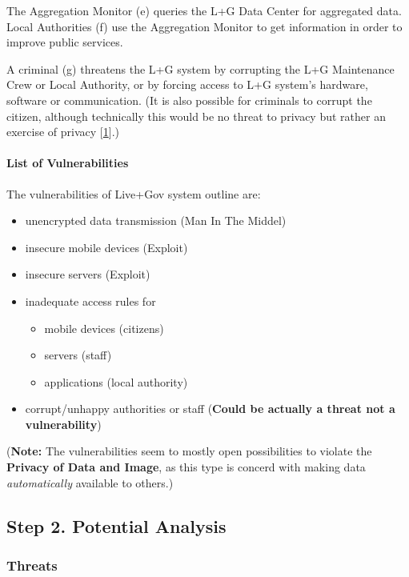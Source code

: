 The Aggregation Monitor (e) queries the L+G Data Center for aggregated
data. Local Authorities (f) use the Aggregation Monitor to get
information in order to improve public services.

A criminal (g) threatens the L+G system by corrupting the L+G
Maintenance Crew or Local Authority, or by forcing access to L+G
system's hardware, software or communication. (It is also possible for
criminals to corrupt the citizen, although technically this would be no
threat to privacy but rather an exercise of privacy
{[}\hyperref[references]{1}{]}.)

\paragraph{List of Vulnerabilities}

The vulnerabilities of Live+Gov system outline are:

\begin{itemize}
\item
  unencrypted data transmission (Man In The Middel)
\item
  insecure mobile devices (Exploit)
\item
  insecure servers (Exploit)
\item
  inadequate access rules for
  \begin{itemize}
  \item
    mobile devices (citizens)
  \item
    servers (staff)
  \item
    applications (local authority)
  \end{itemize}
\item
  corrupt/unhappy authorities or staff (\textbf{Could be actually a
  threat not a vulnerability})
\end{itemize}

(\textbf{Note:} The vulnerabilities seem to mostly open possibilities to
violate the \textbf{Privacy of Data and Image}, as this type is concerd
with making data \emph{automatically} available to others.)

\subsection{Step 2. Potential Analysis}

\subsubsection{Threats}

